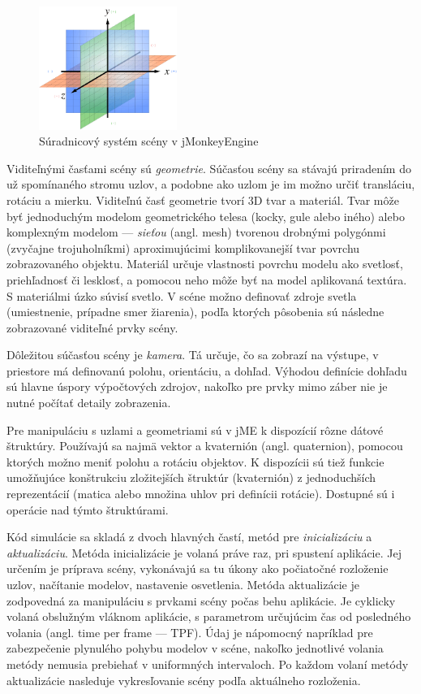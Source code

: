 \begin{figure}
\centerline{\includegraphics[width=0.4\textwidth]{images/coordinate-system}}
\caption[Súradnicový systém scény v jMonkeyEngine]{Súradnicový systém scény v jMonkeyEngine}
\label{obr:coordinate-system}
\end{figure}

Viditeľnými časťami scény sú \textit{geometrie}. Súčasťou scény sa stávajú priradením do už spomínaného stromu uzlov, a podobne ako uzlom je im možno určiť transláciu, rotáciu a mierku. Viditeľnú časť geometrie tvorí 3D tvar a materiál. Tvar môže byť jednoduchým modelom geometrického telesa (kocky, gule alebo iného) alebo komplexným modelom --- \textit{sieťou} (angl. mesh) tvorenou drobnými polygónmi (zvyčajne trojuholníkmi) aproximujúcimi komplikovanejší tvar povrchu zobrazovaného objektu. Materiál určuje vlastnosti povrchu modelu ako svetlosť, priehľadnosť či lesklosť, a pomocou neho môže byť na model aplikovaná textúra. S materiálmi úzko súvisí svetlo. V scéne možno definovať zdroje svetla (umiestnenie, prípadne smer žiarenia), podľa ktorých pôsobenia sú následne zobrazované viditeľné prvky scény.

Dôležitou súčasťou scény je \textit{kamera}. Tá určuje, čo sa zobrazí na výstupe, v priestore má definovanú polohu, orientáciu, a dohľad. Výhodou definície dohľadu sú hlavne úspory výpočtových zdrojov, nakoľko pre prvky mimo záber nie je nutné počítať detaily zobrazenia.

Pre manipuláciu s uzlami a geometriami sú v jME k dispozícií rôzne dátové štruktúry. Používajú sa najmä vektor a kvaternión (angl. quaternion), pomocou ktorých možno meniť polohu a rotáciu objektov. K dispozícii sú tiež funkcie umožňujúce konštrukciu zložitejších štruktúr (kvaternión) z jednoduchších reprezentácií (matica alebo množina uhlov pri definícii rotácie). Dostupné sú i operácie nad týmto štruktúrami.

Kód simulácie sa skladá z dvoch hlavných častí, metód pre \textit{inicializáciu} a \textit{aktualizáciu}. Metóda inicializácie je volaná práve raz, pri spustení aplikácie. Jej určením je príprava scény, vykonávajú sa tu úkony ako počiatočné rozloženie uzlov, načítanie modelov, nastavenie osvetlenia. Metóda aktualizácie je zodpovedná za manipuláciu s prvkami scény počas behu aplikácie. Je cyklicky volaná obslužným vláknom aplikácie, s parametrom určujúcim čas od posledného volania (angl. time per frame --- TPF). Údaj je nápomocný napríklad pre zabezpečenie plynulého pohybu modelov v scéne, nakoľko jednotlivé volania metódy nemusia prebiehať v uniformných intervaloch. Po každom volaní metódy aktualizácie nasleduje vykresľovanie scény podľa aktuálneho rozloženia.

